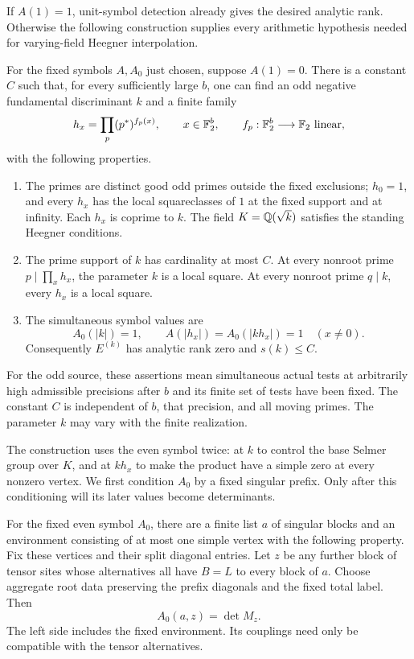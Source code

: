If $A(1)=1$, unit-symbol detection already gives the desired analytic
rank. Otherwise the following construction supplies every arithmetic
hypothesis needed for varying-field Heegner interpolation.

\begin{proposition}
\label{prop:sa:bounded-companion}
For the fixed symbols $A,A_0$ just chosen, suppose $A(1)=0$.
There is a constant $C$ such that, for every sufficiently large $b$,
one can find an odd negative fundamental discriminant $k$ and a finite
family
\[
 h_x=\prod_p(p^*)^{f_p(x)},\qquad x\in\mathbb F_2^b,
 \qquad f_p:\mathbb F_2^b\longrightarrow\mathbb F_2\ \text{linear},
\]
with the following properties.
\begin{enumerate}[label=\textup{(\roman*)}]
\item The primes are distinct good odd primes outside the fixed
exclusions; $h_0=1$, and every $h_x$ has the local squareclasses of
$1$ at the fixed support and at infinity. Each $h_x$ is coprime to $k$.
The field $K=\mathbb Q(\sqrt{k})$ satisfies the standing Heegner conditions.
\item The prime support of $k$ has cardinality at most $C$. At every
nonroot prime $p\mid\prod_xh_x$, the parameter $k$ is a local square.
At every nonroot prime $q\mid k$, every $h_x$ is a local square.
\item The simultaneous symbol values are
\[
 A_0(|k|)=1,\qquad
 A(|h_x|)=A_0(|kh_x|)=1\quad(x\ne0).
\]
Consequently $E^{(k)}$ has analytic rank zero and $s(k)\le C$.
\end{enumerate}
For the odd source, these assertions mean simultaneous actual tests at
arbitrarily high admissible precisions after $b$ and its finite set of
tests have been fixed. The constant $C$ is independent of $b$, that
precision, and all moving primes. The parameter $k$ may vary with the
finite realization.
\end{proposition}

The construction uses the even symbol twice: at $k$ to control the
base Selmer group over $K$, and at $kh_x$ to make the product have a
simple zero at every nonzero vertex. We first condition $A_0$ by a
fixed singular prefix. Only after this conditioning will its later
values become determinants.

\begin{lemma}
\label{lem:sa:prefix}
For the fixed even symbol $A_0$, there are a finite list $a$ of
singular blocks and an environment consisting of at most one simple
vertex with the following property.  Fix these vertices and their
split diagonal entries.  Let $z$ be any further block of tensor sites
whose alternatives all have $B=L$ to every block of $a$.  Choose
aggregate root data preserving the prefix diagonals and the fixed
total label.  Then
\begin{equation}
 A_0(a,z)=\det M_z.
 \label{eq:sa:conditioned-determinant}
\end{equation}
The left side includes the fixed environment.  Its couplings need
only be compatible with the tensor alternatives.
\end{lemma}

